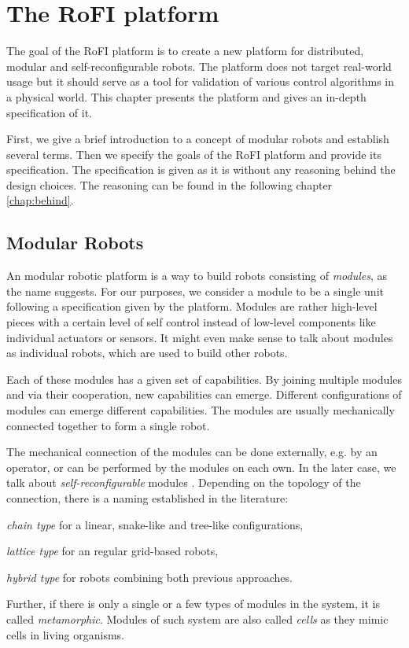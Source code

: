 \chapter{The RoFI platform}\label{chap:rofi}

The goal of the RoFI platform is to create a new platform for distributed,
modular and self-reconfigurable robots. The platform does not target real-world
usage but it should serve as a tool for validation of various control algorithms
in a physical world. This chapter presents the platform and gives an in-depth
specification of it.

First, we give a brief introduction to a concept of modular robots and establish
several terms. Then we specify the goals of the RoFI platform and provide its
specification. The specification is given as it is without any reasoning behind
the design choices. The reasoning can be found in the following chapter
\ref{chap:behind}.

\section{Modular Robots}

An modular robotic platform is a way to build robots consisting of
\emph{modules}, as the name suggests. For our purposes, we consider a module to
be a single unit following a specification given by the platform. Modules are
rather high-level pieces with a certain level of self control instead of
low-level components like individual actuators or sensors. It might even make
sense to talk about modules as individual robots, which are used to build other
robots\cite{brunete_current_2017}.

Each of these modules has a given set of capabilities. By joining multiple
modules and via their cooperation, new capabilities can emerge. Different
configurations of modules can emerge different capabilities. The modules are
usually mechanically connected together to form a single robot.

The mechanical connection of the modules can be done externally, e.g. by an
operator, or can be performed by the modules on each own. In the later case, we
talk about \emph{self-reconfigurable} modules \cite{brunete_current_2017}.
Depending on the topology of the connection, there is a naming established in
the literature\cite{brunete_current_2017}:
\begin{enumerate*}
    \item \emph{chain type} for a linear, snake-like and tree-like configurations,
    \item \emph{lattice type} for an regular grid-based robots,
    \item \emph{hybrid type} for robots combining both previous approaches.
\end{enumerate*}
Further, if there is only a single or a few types of modules in the system, it
is called \emph{metamorphic}\cite{brunete_current_2017}. Modules of such system
are also called \emph{cells} as they mimic cells in living organisms.

